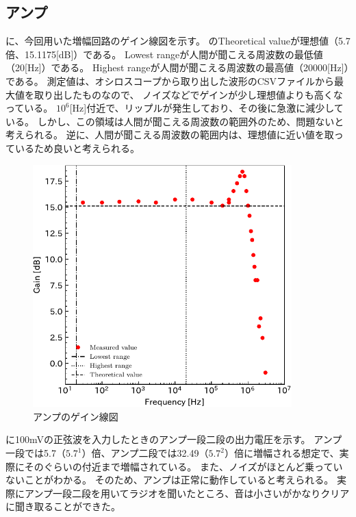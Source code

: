 \documentclass[report.tex]{subfiles}
\begin{document}
\subsection{アンプ}

に、今回用いた増幅回路のゲイン線図を示す。
のTheoretical valueが理想値（5.7倍、15.1175[dB]）である。
Lowest rangeが人間が聞こえる周波数の最低値（20[Hz]）である。
Highest rangeが人間が聞こえる周波数の最高値（20000[Hz]）である。
測定値は、オシロスコープから取り出した波形のCSVファイルから最大値を取り出したものなので、
ノイズなどでゲインが少し理想値よりも高くなっている。
\(10^6\)[Hz]付近で、リップルが発生しており、その後に急激に減少している。
しかし、この領域は人間が聞こえる周波数の範囲外のため、問題ないと考えられる。
逆に、人間が聞こえる周波数の範囲内は、理想値に近い値を取っているため良いと考えられる。

\begin{figure}[H]
	\centering
	\includegraphics[width=10cm]{fig/gain.pdf}
	\caption{アンプのゲイン線図}
	\label{fig:gain}
\end{figure}

に100mVの正弦波を入力したときのアンプ一段二段の出力電圧を示す。
アンプ一段では5.7（\(5.7^1\)）倍、アンプ二段では32.49（\(5.7^2\)）倍に増幅される想定で、実際にそのぐらいの付近まで増幅されている。
また、ノイズがほとんど乗っていないことがわかる。
そのため、アンプは正常に動作していると考えられる。
実際にアンプ一段二段を用いてラジオを聞いたところ、音は小さいがかなりクリアに聞き取ることができた。
\end{document}
